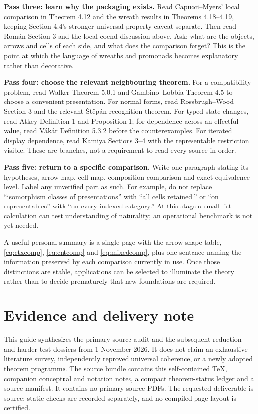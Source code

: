 \documentclass[11pt,letterpaper]{article}
\begin{document}
\textbf{Pass three: learn why the packaging exists.} Read Capucci--Myers' local comparison in Theorem 4.12 and the wreath results in Theorems 4.18--4.19, keeping Section 4.4's stronger universal-property caveat separate. Then read Rom\'an Section 3 and the local coend discussion above. Ask: what are the objects, arrows and cells of each side, and what does the comparison forget? This is the point at which the language of wreaths and promonads becomes explanatory rather than decorative.

\textbf{Pass four: choose the relevant neighbouring theorem.} For a compatibility problem, read Walker Theorem 5.0.1 and Gambino--Lobbia Theorem 4.5 to choose a convenient presentation. For normal forms, read Rosebrugh--Wood Section 3 and the relevant \v{S}t\v{e}p\'an recognition theorem. For typed state changes, read Atkey Definition 1 and Proposition 1; for dependence across an effectful value, read V\'ak\'ar Definition 5.3.2 before the counterexamples. For iterated display dependence, read Kamiya Sections 3--4 with the representable restriction visible. These are branches, not a requirement to read every source in order.

\textbf{Pass five: return to a specific comparison.} Write one paragraph stating its hypotheses, arrow map, cell map, composition comparison and exact equivalence level. Label any unverified part as such. For example, do not replace ``isomorphism classes of presentations'' with ``all cells retained,'' or ``on representables'' with ``on every indexed category.'' At this stage a small list calculation can test understanding of naturality; an operational benchmark is not yet needed.

A useful personal summary is a single page with the arrow-shape table, \eqref{eq:ctxcomp}, \eqref{eq:cntcomp} and \eqref{eq:mixedcomp}, plus one sentence naming the information preserved by each comparison currently in use. Once those distinctions are stable, applications can be selected to illuminate the theory rather than to decide prematurely that new foundations are required.

\section*{Evidence and delivery note}
This guide synthesizes the primary-source audit and the subsequent reduction and harder-test dossiers from 1 November 2026. It does not claim an exhaustive literature survey, independently reproved universal coherence, or a newly adopted theorem programme. The source bundle contains this self-contained TeX, companion conceptual and notation notes, a compact theorem-status ledger and a source manifest. It contains no primary-source PDFs. The requested deliverable is source; static checks are recorded separately, and no compiled page layout is certified.
\end{document}
